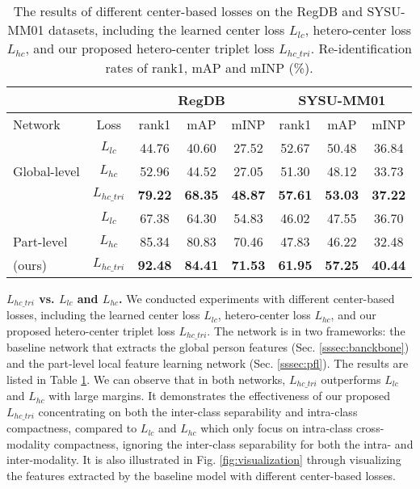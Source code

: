 \documentclass[journal]{IEEEtran}
\begin{document}
\begin{table}
\scriptsize
\caption{The results of different center-based losses on the RegDB and SYSU-MM01 datasets, including the learned center loss $L_{lc}$, hetero-center loss $L_{hc}$, and our proposed hetero-center triplet loss $L_{hc\_tri}$. Re-identification rates of rank1, mAP and mINP (\%).}
\label{tab:centerloss}
  \centering
\begin{tabular}{l|c|c|c|c|c|c|c}
   \toprule[2pt]
    \multicolumn{2}{c|}{} & \multicolumn{3}{c|}{RegDB} & \multicolumn{3}{c}{SYSU-MM01}\\ \hline
    Network & Loss & rank1 & mAP & mINP & rank1 & mAP & mINP \\ \toprule[1pt]
    \multirow{3}{*}{Global-level}& $L_{lc}$ &  44.76 & 40.60 & 27.52 & 52.67 & 50.48 & 36.84\\
    & $L_{hc}$ & 52.96 & 44.52 & 27.05 & 51.30 & 48.12 & 33.73 \\
    & $L_{hc\_tri}$ & \textbf{79.22} & \textbf{68.35} & \textbf{48.87} &  \textbf{57.61} & \textbf{53.03} & \textbf{37.22}  \\ \hline \hline
    & $L_{lc}$ &  67.38 & 64.30 & 54.83 &  46.02 & 47.55 & 36.70  \\
    Part-level & $L_{hc}$ & 85.34 & 80.83 & 70.46 &  47.83 & 46.22 & 32.48 \\
    (ours)&$L_{hc\_tri}$ & \textbf{92.48} & \textbf{84.41} & \textbf{71.53} & \textbf{61.95} & \textbf{57.25} & \textbf{40.44} \\ \toprule[2pt]
  \end{tabular}
\end{table}

\textbf{$L_{hc\_tri}$ vs. $L_{lc}$ and $L_{hc}$.} We conducted experiments with different center-based losses, including the learned center loss $L_{lc}$, hetero-center loss $L_{hc}$, and our proposed hetero-center triplet loss $L_{hc\_tri}$. The network is in two frameworks: the baseline network that extracts the global person features (Sec. \ref{sssec:banckbone}) and the part-level local feature learning network (Sec. \ref{sssec:pfl}). The results are listed in Table \ref{tab:centerloss}. We can observe that in both networks, $L_{hc\_tri}$ outperforms $L_{lc}$ and $L_{hc}$ with large margins. It demonstrates the effectiveness of our proposed $L_{hc\_tri}$ concentrating on both the inter-class separability and intra-class compactness, compared to $L_{lc}$ and $L_{hc}$ which only focus on intra-class cross-modality compactness, ignoring the inter-class separability for both the intra- and inter-modality. It is also illustrated in Fig. \ref{fig:visualization} through visualizing the features extracted by the baseline model with different center-based losses.
\end{document}

